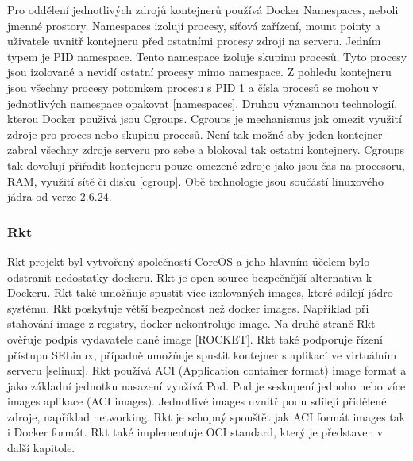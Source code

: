Pro oddělení jednotlivých zdrojů kontejnerů používá Docker Namespaces, neboli jmenné prostory. Namespaces izolují procesy, síťová zařízení, mount pointy a uživatele uvnitř kontejneru před ostatními procesy zdroji na serveru. Jedním typem je PID namespace. Tento namespace izoluje skupinu procesů. Tyto procesy jsou izolované a nevidí ostatní procesy mimo namespace. Z pohledu kontejneru jsou všechny procesy potomkem procesu s PID 1 a čísla procesů se mohou v jednotlivých namespace opakovat [namespaces]. Druhou významnou technologií, kterou Docker použivá jsou Cgroups. Cgroups je mechanismus jak omezit využití zdroje pro proces nebo skupinu procesů. Není tak možné aby jeden kontejner zabral všechny zdroje serveru pro sebe a blokoval tak ostatní kontejnery. Cgroups tak dovolují přiřadit kontejneru pouze omezené zdroje jako jsou čas na procesoru, RAM, využití sítě či disku [cgroup]. Obě technologie jsou součástí linuxového jádra od verze 2.6.24.\par
\subsubsection{Rkt}
Rkt projekt byl vytvořený společností CoreOS a jeho hlavním účelem bylo odstranit nedostatky dockeru. Rkt je open source bezpečnější alternativa k Dockeru. Rkt také umožňuje spustit více izolovaných images, které sdílejí jádro systému. Rkt poskytuje větší bezpečnost než docker images. Například při stahování image z registry, docker nekontroluje image. Na druhé straně Rkt ověřuje podpis vydavatele dané image [ROCKET]. Rkt také podporuje řízení přístupu SELinux, případně umožňuje spustit kontejner s aplikací ve virtuálním serveru [selinux]. Rkt používá ACI (Application container format) image format a jako základní jednotku nasazení využívá Pod. Pod je seskupení jednoho nebo více images aplikace (ACI images). Jednotlivé images uvnitř podu sdílejí přidělené zdroje, například networking. Rkt je schopný spouštět jak ACI formát images tak i Docker formát. Rkt také implementuje OCI standard, který je představen v další kapitole.
